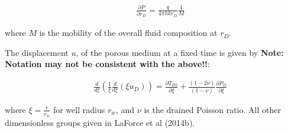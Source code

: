 \documentclass[12pt]{report}
\begin{document}
\begin{eqnarray}
&&\frac{\partial P}{\partial r_D} = \frac{q}{4\pi h k r_D}
  \frac{1}{M}\label{eqn:P_again}
\end{eqnarray}

\noindent where $M$ is the mobility of the overall fluid composition
at $r_D$.

The displacement $u$, of the porous medium at a fixed time is given by
{\bf Note: Notation may not be consistent with the above!!}:

\begin{eqnarray}
&&\frac{d}{d \xi}\left(\frac{1}{\xi}\frac{d}{d \xi}(\xi u_D)\right) = \frac{\partial T_{D2}}{\partial \xi}+
\frac{(1-2\nu)}{(1-\nu)}\frac{\partial P_D}{\partial \xi}\label{eqn:disp_u}
\end{eqnarray}

\noindent where $\xi = \frac{r}{r_w}$ for well radius $r_w$, and $\nu$ is the drained Poisson ratio.  All other dimensionless groups given in LaForce et al (2014b).


\end{document}
